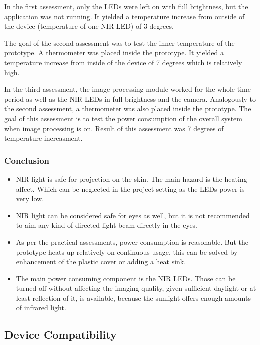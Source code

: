 In the first assessment, only the LEDs were left on with full brightness, but the application was not running. It yielded a temperature increase from outside of the device (temperature of one NIR LED) of 3 degrees.

The goal of the second assessment was to test the inner temperature of the prototype. A thermometer was placed inside the prototype. It yielded a temperature increase from inside of the device of 7 degrees which is relatively high.

In the third assessment, the image processing module worked for the whole time period as well as the NIR LEDs in full brightness and the camera. Analogously to the second assessment, a thermometer was also placed inside the prototype. The goal of this assessment is to test the power consumption of the overall system when image processing is on. Result of this assessment was 7 degrees of temperature increasment.

\subsubsection{Conclusion }

\begin{itemize}

\item NIR light is safe for projection on the skin. The main hazard is the heating affect. Which can be neglected in the project setting as the LEDs power is very low. 
\item NIR light can be considered safe for eyes as well, but it is not recommended to aim any kind of directed light beam directly in the eyes.
\item As per the practical assessments, power consumption is reasonable. But the prototype heats up relatively on continuous usage, this can be solved by enhancement of the plastic cover or adding a heat sink.
\item The main power consuming component is the NIR LEDs. Those can be turned off without affecting the imaging quality, given sufficient daylight or at least reflection of it, is available, because the sunlight offers enough amounts of infrared light.

\end{itemize}


\subsection{Device Compatibility}

